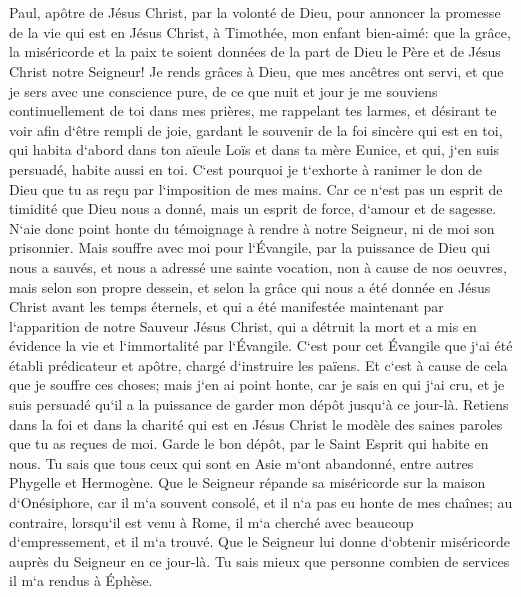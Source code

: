 

\chapter{}

\verse Paul, apôtre de Jésus Christ, par la volonté de Dieu, pour annoncer la promesse de la vie qui est en Jésus Christ, 
\verse à Timothée, mon enfant bien-aimé: que la grâce, la miséricorde et la paix te soient données de la part de Dieu le Père et de Jésus Christ notre Seigneur! 
\verse Je rends grâces à Dieu, que mes ancêtres ont servi, et que je sers avec une conscience pure, de ce que nuit et jour je me souviens continuellement de toi dans mes prières, 
\verse me rappelant tes larmes, et désirant te voir afin d`être rempli de joie, 
\verse gardant le souvenir de la foi sincère qui est en toi, qui habita d`abord dans ton aïeule Loïs et dans ta mère Eunice, et qui, j`en suis persuadé, habite aussi en toi. 
\verse C`est pourquoi je t`exhorte à ranimer le don de Dieu que tu as reçu par l`imposition de mes mains. 
\verse Car ce n`est pas un esprit de timidité que Dieu nous a donné, mais un esprit de force, d`amour et de sagesse. 
\verse N`aie donc point honte du témoignage à rendre à notre Seigneur, ni de moi son prisonnier. Mais souffre avec moi pour l`Évangile, 
\verse par la puissance de Dieu qui nous a sauvés, et nous a adressé une sainte vocation, non à cause de nos oeuvres, mais selon son propre dessein, et selon la grâce qui nous a été donnée en Jésus Christ avant les temps éternels, 
\verse et qui a été manifestée maintenant par l`apparition de notre Sauveur Jésus Christ, qui a détruit la mort et a mis en évidence la vie et l`immortalité par l`Évangile. 
\verse C`est pour cet Évangile que j`ai été établi prédicateur et apôtre, chargé d`instruire les païens. 
\verse Et c`est à cause de cela que je souffre ces choses; mais j`en ai point honte, car je sais en qui j`ai cru, et je suis persuadé qu`il a la puissance de garder mon dépôt jusqu`à ce jour-là. 
\verse Retiens dans la foi et dans la charité qui est en Jésus Christ le modèle des saines paroles que tu as reçues de moi. 
\verse Garde le bon dépôt, par le Saint Esprit qui habite en nous. 
\verse Tu sais que tous ceux qui sont en Asie m`ont abandonné, entre autres Phygelle et Hermogène. 
\verse Que le Seigneur répande sa miséricorde sur la maison d`Onésiphore, car il m`a souvent consolé, et il n`a pas eu honte de mes chaînes; 
\verse au contraire, lorsqu`il est venu à Rome, il m`a cherché avec beaucoup d`empressement, et il m`a trouvé. 
\verse Que le Seigneur lui donne d`obtenir miséricorde auprès du Seigneur en ce jour-là. Tu sais mieux que personne combien de services il m`a rendus à Éphèse. 

